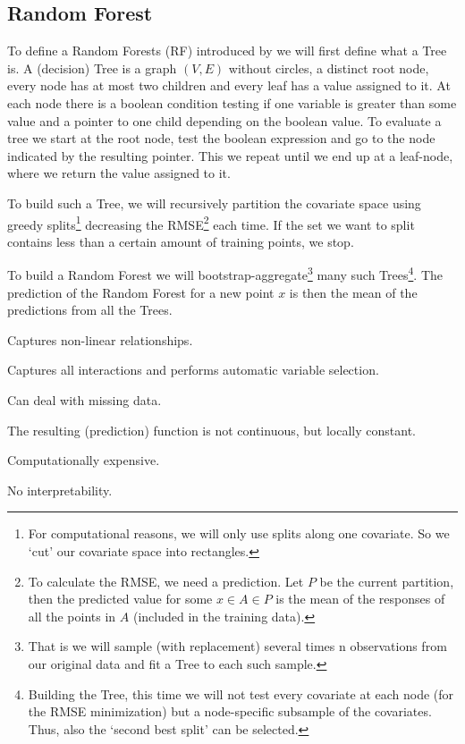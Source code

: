 \subsection{Random Forest}{\label{sec:corr_model_RF}
    To define a Random Forests (RF) introduced by \cite{breimanRandomForests2001}  we will first define what a Tree is. A {(decision) Tree} is a graph $(V,E)$ without circles, a distinct root node, every node has at most two children and every leaf has a value assigned to it. At each node there is a boolean condition testing if one variable is greater than some value and a pointer to one child depending on the boolean value. To evaluate a tree we start at the root node, test the boolean expression and go to the node indicated by the resulting pointer. This we repeat until we end up at a leaf-node, where we return the value assigned to it. 
    
    To build such a Tree, we will recursively partition the covariate space using greedy splits\footnote{For computational reasons, we will only use splits along one covariate. So we `cut' our covariate space into rectangles.} decreasing the RMSE\footnote{To calculate the RMSE, we need a prediction. Let $P$ be the current partition, then the predicted value for some $x\in A \in P$ is the mean of the responses of all the points in $A$ (included in the training data).} each time. If the set we want to split contains less than a certain amount of training points, we stop.
    
    To build a {Random Forest} we will bootstrap-aggregate\footnote{That is we will sample (with replacement) several times n observations from our original data and fit a Tree to each such sample.} many such Trees\footnote{Building the Tree, this time we will not test every covariate at each node (for the RMSE minimization) but a node-specific subsample of the covariates. Thus, also the `second best split' can be selected.}. The prediction of the Random Forest for a new point $x$ is then the mean of the predictions from all the Trees. 
    \begin{my_pros_cons_table}{
        \item Captures non-linear relationships.
        \item Captures all interactions and performs automatic variable selection.
        \item Can deal with missing data.
    }{
        \item The resulting (prediction) function is not continuous, but locally constant.
        \item Computationally expensive.
        \item No interpretability.
    }
    \end{my_pros_cons_table}
}
